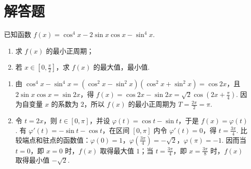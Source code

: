 \section{解答题}
\begin{problem}
已知函数 \(f(x)=\cos^{4}x-2\sin x\cos x-\sin^{4}x\).
\begin{enumerate}
\item 求 \(f(x)\) 的最小正周期；
\item 若 \(x\in\left[0,\frac{\pi}{2}\right]\)，求 \(f(x)\) 的最大值，最小值.
\end{enumerate}

\begin{solution}
\begin{enumerate}
\item 由 \(\cos^4x-\sin^4x=(\cos^2x-\sin^2x)(\cos^2x+\sin^2x)=\cos 2x\)，且 \(2\sin x\cos x=\sin 2x\)，得 \(f(x)=\cos 2x-\sin 2x=\sqrt{2}\cos\left(2x+\frac{\pi}{4}\right)\). 因为自变量 \(x\) 的系数为 \(2\)，所以 \(f(x)\) 的最小正周期为 \(T=\frac{2\pi}{2}=\pi\).
\item 令 \(t=2x\)，则 \(t\in[0,\pi]\)，并设 \(\varphi(t)=\cos t-\sin t\)，于是 \(f(x)=\varphi(t)\). 有 \(\varphi'(t)=-\sin t-\cos t\)，在区间 \([0,\pi]\) 内令 \(\varphi'(t)=0\)，得 \(t=\frac{3\pi}{4}\). 比较端点和驻点的函数值：\(\varphi(0)=1\)，\(\varphi(\frac{3\pi}{4})=-\sqrt{2}\)，\(\varphi(\pi)=-1\). 因而当 \(t=0\)，即 \(x=0\) 时，\(f(x)\) 取得最大值 \(1\)；当 \(t=\frac{3\pi}{4}\)，即 \(x=\frac{3\pi}{8}\) 时，\(f(x)\) 取得最小值 \(-\sqrt{2}\).
\end{enumerate}
\end{solution}
\end{problem}

